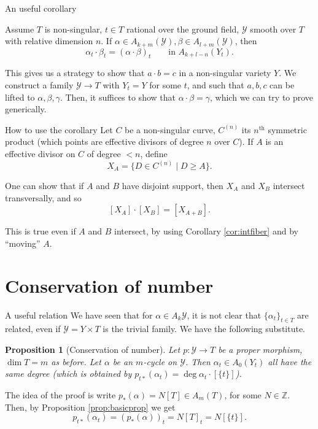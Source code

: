 \documentclass{beamer}
\newtheorem{prop}[theorem]{Proposition}
\newcommand{\Y}{\mathscr{Y}}
\newcommand{\Z}{\mathbb{Z}}
\begin{document}
\begin{frame}{An useful corollary}
\begin{corollary}
Assume $T$ is non-singular, $t \in T$ rational over the ground field, $\Y$ smooth over $T$ with relative dimension $n$. If $\alpha \in A_{k+m}(\Y), \beta \in A_{l+m}(\Y)$, then \label{cor:intfiber}
\[ \alpha_t \cdot \beta_t = (\alpha \cdot \beta)_t \qquad \text{in } A_{k+l-n}(Y_t). \]
\end{corollary}

\pause

This gives us a strategy to show that $a \cdot b=c$ in a non-singular variety $Y$. We construct a family $\Y \to T$ with $Y_t=Y$ for some $t$, and such that $a, b, c$ can be lifted to $\alpha, \beta, \gamma$. Then, it suffices to show that $\alpha \cdot \beta=\gamma$, which we can try to prove generically.
\end{frame}



\begin{frame}{How to use the corollary}
Let $C$ be a non-singular curve, $C^{(n)}$ its $n^{\text{th}}$ symmetric product (which points are effective divisors of degree $n$ over $C$). If $A$ is an effective divisor on $C$ of degree $<n$, define
\[ X_A=\{D \in C^{(n)} \mid D \geq A \}. \]

\pause

One can show that if $A$ and $B$ have disjoint support, then $X_A$ and $X_B$ intersect transversally, and so
\[ [X_A] \cdot [X_B]=[X_{A+B}]. \]

\pause 

This is true even if $A$ and $B$ intersect, by using Corollary \ref{cor:intfiber} and by ``moving'' $A$. 
\end{frame}



\section{Conservation of number}



\begin{frame}{A useful relation}
We have seen that for $\alpha \in A_k\Y$, it is not clear that $\{\alpha_t\}_{t \in T}$ are related, even if $\Y=Y \times T$ is the trivial family. \pause We have the following substitute.

\begin{prop}[Conservation of number]
Let $p\colon \Y \to T$ be a proper morphism, $\dim T=m$ as before. Let $\alpha$ be an $m$-cycle on $\Y$. Then $\alpha_t \in A_0(Y_t)$ all have the same degree (which is obtained by $p_{t\ast}(\alpha_t)=\deg \alpha_t\cdot [\{t\}]$). 
\end{prop}

\pause

The idea of the proof is write $p_\ast(\alpha)=N[T] \in A_m(T)$, for some $N \in \Z$. Then, by Proposition \ref{prop:basicprop} we get
\[ p_{t\ast}(\alpha_t)=(p_\ast(\alpha))_t = N[T]_t= N[\{t\}]. \]
\end{frame}
\end{document}
